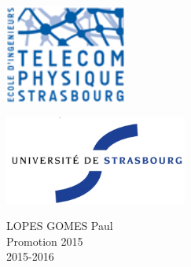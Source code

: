 \documentclass[a4paper, 12pt]{report}
\begin{document}

\begin{minipage}[t]{0.45\linewidth}
  \begin{flushleft}
    \includegraphics[width=0.30\textwidth]{../Pictures/TPS.png}
  \end{flushleft}
\end{minipage}
\quad
\begin{minipage}[t]{0.45\linewidth}
  \begin{flushright}
    \includegraphics[width=0.45\textwidth]{../Pictures/university_strass.jpg}
  \end{flushright}
\end{minipage}
\vspace{1cm}
\begin{flushright}
\begin{minipage}{0.25\textwidth}
    LOPES GOMES Paul\\
    Promotion 2015\\
    2015-2016
\end{minipage}
\end{flushright}


\end{document}
